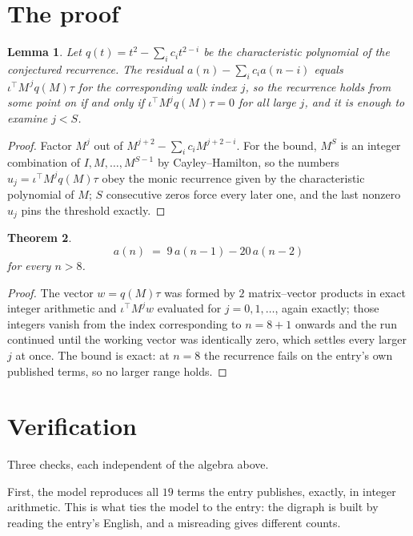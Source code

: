 \documentclass[11pt,a4paper]{article}
\theoremstyle{plain}
\newtheorem{theorem}{Theorem}
\newtheorem{lemma}[theorem]{Lemma}
\theoremstyle{definition}
\begin{document}
\section{The proof}

\begin{lemma}\label{lem:crit}
Let $q(t)=t^{2}-\sum_i c_it^{2-i}$ be the characteristic polynomial of the
conjectured recurrence. The residual $a(n)-\sum_ic_ia(n-i)$ equals
$\iota^{\!\top}M^{\,j}q(M)\tau$ for the corresponding walk index $j$, so the recurrence
holds from some point on if and only if $\iota^{\!\top}M^{j}q(M)\tau=0$ for all large $j$,
and it is enough to examine $j<S$.
\end{lemma}

\begin{proof}
Factor $M^{j}$ out of $M^{j+2}-\sum_ic_iM^{j+2-i}$. For the bound, $M^{S}$
is an integer combination of $I,M,\dots,M^{S-1}$ by Cayley--Hamilton, so the numbers
$u_j=\iota^{\!\top}M^{j}q(M)\tau$ obey the monic recurrence given by the characteristic
polynomial of $M$; $S$ consecutive zeros force every later one, and the last nonzero $u_j$
pins the threshold exactly.
\end{proof}

\begin{theorem}
\[
a(n)\;=\;9\,a(n-1) - 20\,a(n-2)
\]
for every $n>8$.
\end{theorem}

\begin{proof}
The vector $w=q(M)\tau$ was formed by $2$ matrix--vector products in exact integer
arithmetic and $\iota^{\!\top}M^{j}w$ evaluated for $j=0,1,\dots$, again exactly; those
integers vanish from the index corresponding to $n=8+1$ onwards and the run continued
until the working vector was identically zero, which settles every larger $j$ at once. The bound is exact: at $n=8$ the recurrence fails on the entry's own published terms, so no larger range holds.
\end{proof}

\section{Verification}

Three checks, each independent of the algebra above.

First, the model reproduces all $19$ terms the entry publishes, exactly, in integer
arithmetic. This is what ties the model to the entry: the digraph is built by reading the
entry's English, and a misreading gives different counts.
\end{document}
